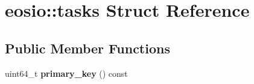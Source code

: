 \hypertarget{structeosio_1_1tasks}{}\section{eosio\+:\+:tasks Struct Reference}
\label{structeosio_1_1tasks}
\subsection*{Public Member Functions}
\begin{DoxyCompactItemize}
\item 
\mbox{\label{structeosio_1_1tasks_a0b184f66ede408983f8a38e940ddb568}} 
uint64\+\_\+t {\bfseries primary\+\_\+key} () const
\end{DoxyCompactItemize}
